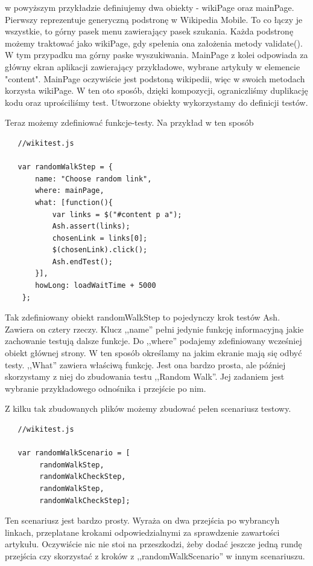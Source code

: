 \documentclass[brudnopis]{xmgr}
\begin{document}
w powyższym przykładzie definiujemy dwa obiekty - wikiPage oraz mainPage. Pierwszy reprezentuje generyczną podstronę w Wikipedia Mobile. To co łączy je wszystkie, to górny pasek menu zawierający pasek szukania. Każda podstronę możemy traktować jako wikiPage, gdy spełenia ona założenia metody validate(). W tym przypadku ma górny paske wyszukiwania. MainPage z kolei odpowiada za główny ekran aplikacji zawierający przykładowe, wybrane artykuły w elemencie "content". MainPage oczywiście jest podstoną wikipedii, więc w swoich metodach korzysta wikiPage. W ten oto sposób, dzięki kompozycji, ograniczliśmy duplikację kodu oraz uprościliśmy test. Utworzone obiekty wykorzystamy do definicji testów.

Teraz możemy zdefiniować funkcje-testy. Na przykład w ten sposób

\begin{lstlisting}
   //wikitest.js

   var randomWalkStep = {
       name: "Choose random link",
       where: mainPage,
       what: [function(){
           var links = $("#content p a");
           Ash.assert(links);
           chosenLink = links[0];
           $(chosenLink).click();
           Ash.endTest();
       }],
       howLong: loadWaitTime + 5000
    };
\end{lstlisting}

Tak zdefiniowany obiekt randomWalkStep to pojedynczy krok testów Ash. Zawiera on cztery rzeczy. Klucz ,,name'' pełni jedynie funkcję informacyjną jakie zachowanie testują dalsze funkcje. Do ,,where'' podajemy zdefiniowany wcześniej obiekt głównej strony. W ten sposób określamy na jakim ekranie mają się odbyć testy. ,,What'' zawiera właściwą funkcję. Jest ona bardzo prosta, ale później skorzystamy z niej do zbudowania testu ,,Random Walk''. Jej zadaniem jest wybranie przykładowego odnośnika i przejście po nim. 

Z kilku tak zbudowanych plików możemy zbudować pełen scenariusz testowy.

\begin{lstlisting}
   //wikitest.js

   var randomWalkScenario = [
        randomWalkStep,
        randomWalkCheckStep,
        randomWalkStep,
        randomWalkCheckStep];

\end{lstlisting}

Ten scenariusz jest bardzo prosty. Wyraża on dwa przejścia po wybrancyh linkach, przeplatane krokami odpowiedzialnymi za sprawdzenie zawartości artykułu. Oczywiście nic nie stoi na przeszkodzi, żeby dodać jeszcze jedną rundę przejścia czy skorzystać z kroków z ,,randomWalkScenario'' w innym scenariuszu.
\end{document}
